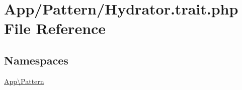 \hypertarget{_hydrator_8trait_8php}{}\section{App/\+Pattern/\+Hydrator.trait.\+php File Reference}
\label{_hydrator_8trait_8php}
\subsection*{Namespaces}
\begin{DoxyCompactItemize}
\item 
 \hyperlink{namespace_app_1_1_pattern}{App\textbackslash{}\+Pattern}
\end{DoxyCompactItemize}
